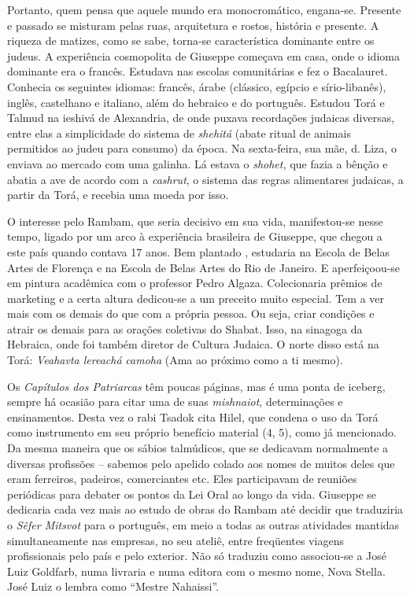 Portanto, quem pensa que aquele mundo era monocromático, engana-se.
Presente e passado se misturam pelas ruas, arquitetura e rostos,
história e presente. A riqueza de matizes, como se sabe, torna-se
característica dominante entre os judeus. A experiência cosmopolita de
Giuseppe começava em casa, onde o idioma dominante era o francês.
Estudava nas escolas comunitárias e fez o Bacalauret. Conhecia os
seguintes idiomas: francês, árabe (clássico, egípcio e sírio-libanês),
inglês, castelhano e italiano, além do hebraico e do português. Estudou
Torá e Talmud na ieshivá de Alexandria, de onde puxava recordações
judaicas diversas, entre elas a simplicidade do sistema de
\emph{shehitá} (abate ritual de animais permitidos ao judeu para
consumo) da época. Na sexta-feira, sua mãe, d. Liza, o enviava ao
mercado com uma galinha. Lá estava o \emph{shohet,} que fazia a bênção e
abatia a ave de acordo com a \emph{cashrut}, o sistema das regras
alimentares judaicas, a partir da Torá, e recebia uma moeda por isso.

O interesse pelo Rambam, que seria decisivo em sua vida, manifestou-se
nesse tempo, ligado por um arco à experiência brasileira de Giuseppe,
que chegou a este país quando contava 17 anos. Bem plantado , estudaria
na Escola de Belas Artes de Florença e na Escola de Belas Artes do Rio
de Janeiro. E aperfeiçoou-se em pintura acadêmica com o professor Pedro
Algaza. Colecionaria prêmios de marketing e a certa altura dedicou-se a
um preceito muito especial. Tem a ver mais com os demais do que com a
própria pessoa. Ou seja, criar condições e atrair os demais para as
orações coletivas do Shabat. Isso, na sinagoga da Hebraica, onde foi
também diretor de Cultura Judaica. O norte disso está na Torá:
\emph{Veahavta lereachá} \emph{camoha} (Ama ao próximo como a ti mesmo).

Os \emph{Capítulos dos Patriarcas} têm poucas páginas, mas é uma ponta
de iceberg, sempre há ocasião para citar uma de suas \emph{mishnaiot},
determinações e ensinamentos. Desta vez o rabi Tsadok cita Hilel, que
condena o uso da Torá como instrumento em seu próprio benefício material
(4, 5), como já mencionado. Da mesma maneira que os sábios talmúdicos,
que se dedicavam normalmente a diversas profissões -- sabemos pelo
apelido colado aos nomes de muitos deles que eram ferreiros, padeiros,
comerciantes etc. Eles participavam de reuniões periódicas para debater
os pontos da Lei Oral ao longo da vida. Giuseppe se dedicaria cada vez
mais ao estudo de obras do Rambam até decidir que traduziria o
\emph{Sêfer Mitsvot} para o português, em meio a todas as outras
atividades mantidas simultaneamente nas empresas, no seu ateliê, entre
freqüentes viagens profissionais pelo país e pelo exterior. Não só
traduziu como associou-se a José Luiz Goldfarb, numa livraria e numa
editora com o mesmo nome, Nova Stella. José Luiz o lembra como ``Mestre
Nahaissi''.

